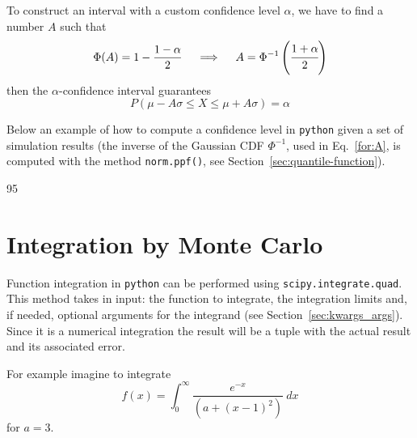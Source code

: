 To construct an interval with a custom confidence level $\alpha$, we have to find a number $A$ such that
\begin{equation}
\Phi(A) = 1 - \frac{1-\alpha}{2}\quad\implies\quad A = \Phi^{-1}\left(\cfrac{1+\alpha}{2}\right)
\label{for:A}
\end{equation}
then the $\alpha$-confidence interval guarantees
\begin{equation}
P(\mu - A\sigma \le X \le \mu+ A\sigma) = \alpha 
\end{equation}

Below an example of how to compute a confidence level in \texttt{python} given a set of simulation results (the inverse of the Gaussian CDF $\Phi^{-1}$, used in Eq.~\ref{for:A}, is computed with the method \texttt{norm.ppf()}, see Section~\ref{sec:quantile-function}).

\begin{ioutput}
95%
\end{ioutput}

%

\section{Integration by Monte Carlo}
\label{sec:integration}
Function integration in \texttt{python} can be performed using \texttt{scipy.integrate.quad}. 
This method takes in input: the function to integrate, the integration limits and, if needed, optional arguments for the integrand (see Section~\ref{sec:kwargs_args}). Since it is a numerical integration the result will be a tuple with the actual result and its associated error.

For example imagine to integrate
\begin{equation*}
f(x) = \int_{0}^{\infty}\frac{e^{-x}}{\left(a + (x-1)^2\right)}~dx
\end{equation*}
for $a=3$.

